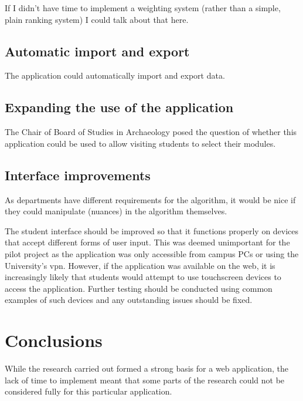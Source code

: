 \documentclass[]{scrartcl}
\begin{document}
If I didn't have time to implement a weighting system (rather than a simple,
plain ranking system) I could talk about that here.


\subsection{Automatic import and export}
\label{sec:autoexport}

The application could automatically import and export data.

\subsection{Expanding the use of the application}

The Chair of Board of Studies in Archaeology posed the question of whether
this application could be used to allow visiting students to select their
modules.

\subsection{Interface improvements}

As departments have different requirements for the algorithm, it would be nice
if they could manipulate (nuances) in the algorithm themselves.

The student interface should be improved so that it functions properly on
devices that accept different forms of user input. This was deemed unimportant
for the pilot project as the application was only accessible from campus PCs
or using the University's \gls{vpn}. However, if the application was available
on the web, it is increasingly likely that students would attempt to use
touchscreen devices to access the application. Further testing should be
conducted using common examples of such devices and any outstanding issues
should be fixed.

\section{Conclusions}
\label{sec:conclusions}


While the research carried out formed a strong basis for a web application,
the lack of time to implement meant that some parts of the research could not
be considered fully for this particular application.
\end{document}

